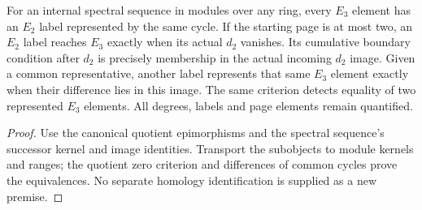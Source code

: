 \begin{proposition}
  \label{prop:internal-page-three-representatives}
  \leanok
  For an internal spectral sequence in modules over any ring, every
  $E_3$ element has an $E_2$ label represented by the same cycle.
  If the starting page is at most two, an $E_2$ label reaches $E_3$
  exactly when its actual $d_2$ vanishes. Its cumulative boundary
  condition after $d_2$ is precisely membership in the actual incoming
  $d_2$ image. Given a common representative, another label represents
  that same $E_3$ element exactly when their difference lies in this image.
  The same criterion detects equality of two represented $E_3$ elements.
  All degrees, labels and page elements remain quantified.
\end{proposition}
\begin{proof}
  \leanok
  Use the canonical quotient epimorphisms and the spectral sequence's
  successor kernel and image identities. Transport the subobjects to
  module kernels and ranges; the quotient zero criterion and differences
  of common cycles prove the equivalences. No separate homology
  identification is supplied as a new premise.
\end{proof}

